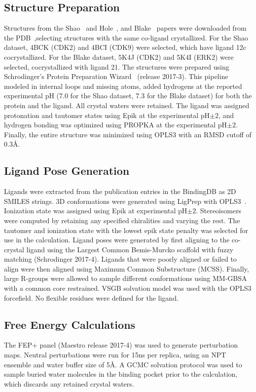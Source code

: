 \documentclass[phd,tocprelim]{cornell}
\begin{document}
\subsection{Structure Preparation}
Structures from the Shao~\citep{Shao2013-oe} and Hole~\citep{Hole2013-sr}, and Blake~\citep{Blake2016-su} papers were downloaded from the PDB~\citep{Berman2002-hg},selecting structures with the same co-ligand crystallized. For the Shao dataset, 4BCK (CDK2) and 4BCI (CDK9) were selected, which have ligand 12c cocrystallized. For the Blake dataset, 5K4J (CDK2) and 5K4I (ERK2) were selected, cocrystallized with ligand 21. The structures were prepared using Schrodinger’s Protein Preparation Wizard~\citep{Sastry2013-ax} (release 2017-3). This pipeline modeled in internal loops and missing atoms, added hydrogens at the reported experimental pH (7.0 for the Shao dataset, 7.3 for the Blake dataset) for both the protein and the ligand. All crystal waters were retained. The ligand was assigned protonation and tautomer states using Epik at the experimental pH$\pm2$, and hydrogen bonding was optimized using PROPKA at the experimental pH$\pm2$. Finally, the entire structure was minimized using OPLS3 with an RMSD cutoff of 0.3\AA.

\subsection{Ligand Pose Generation}
Ligands were extracted from the publication entries in the BindingDB as  2D SMILES strings. 3D conformations were generated using LigPrep with OPLS3~\citep{Harder2016-zn}. Ionization state was assigned using Epik at experimental pH$\pm2$. Stereoisomers were computed by retaining any specified chiralities and varying the rest. The tautomer and ionization state with the lowest epik state penalty was selected for use in the calculation. Ligand poses were generated by first aligning to the co-crystal ligand using the Largest Common Bemis-Murcko scaffold with fuzzy matching (Schrodinger 2017-4). Ligands that were poorly aligned or failed to align were then aligned using Maximum Common Substructure (MCSS). Finally, large R-groups were allowed to sample different conformations using MM-GBSA with a common core restrained. VSGB solvation model was used with the OPLS3 forcefield. No flexible residues were defined for the ligand. 

\subsection{Free Energy Calculations}
The FEP+ panel (Maestro release 2017-4) was used to generate perturbation maps. Neutral perturbations were run for 15ns per replica, using an NPT ensemble and water buffer size of 5\AA. A GCMC solvation protocol was used to sample buried water molecules in the binding pocket prior to the calculation, which discards any retained crystal waters. 
\end{document}
